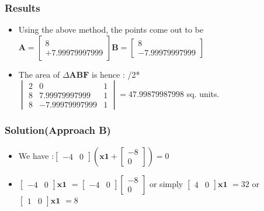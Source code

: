 \documentclass{beamer}
\begin{document}
\begin{frame}
\frametitle{Results}
\begin{itemize}
	\item<1->Using the above method, the points come out to be \newline \newline$\mathbf{A} = \begin{bmatrix} 8 \\ +7.99979997999
	\end{bmatrix} $\newline $\mathbf{B} = \begin{bmatrix} 8 \\ -7.99979997999
	\end{bmatrix}$\newline \newline
	\item<2->The area of $\Delta\mathbf{ABF}$ is hence : \newline {}/2*$\begin{vmatrix}2 & 0 & 1 \\ 8 & 7.99979997999 & 1 \\ 8 & -7.99979997999 & 1
	\end{vmatrix} = 47.99879987998$ sq. units.
\end{itemize}
\end{frame}


\begin{frame}
\frametitle{Solution(Approach B)}
\begin{itemize}
	\item<1-> We have :\newline \newline $\begin{bmatrix} -4 & 0
	\end{bmatrix} (\mathbf{x1} +\begin{bmatrix} -8 \\ 0
	\end{bmatrix} ) = 0 $
	\item<2->  $\begin{bmatrix} -4 & 0
	\end{bmatrix} \mathbf{x1}$  $ = \begin{bmatrix} -4 & 0
	\end{bmatrix} \begin{bmatrix} -8 \\ 0
	\end{bmatrix}$ or simply \newline \newline $\begin{bmatrix} 4 & 0
	\end{bmatrix} \mathbf{x1}$  $ = 32$ \newline
	\newline
	or $\begin{bmatrix} 1 & 0
	\end{bmatrix} \mathbf{x1}$  $ = 8$
\end{itemize}
\end{frame}
\end{document}
